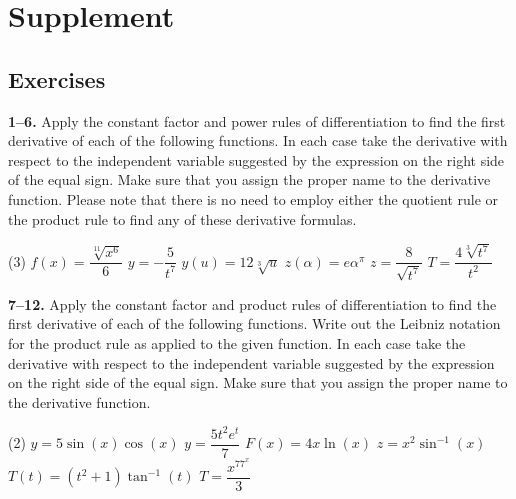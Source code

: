 \documentclass[10pt,oneside,]{book}
\theoremstyle{plain}
\theoremstyle{definition}
\numberwithin{equation}{section}
\newcommand{\fe}[2]{#1\mathopen{}\left(#2\right)\mathclose{}}
\begin{document}
\section[Supplement]{Supplement}\label{derivative-formulas-supplementary-exercises}
\typeout{************************************************}
\typeout{************************************************}
\subsection[Exercises]{Exercises}\label{exercises-42}
\textbf{1--6. }\hypertarget{exercisegroup-84}{\null}Apply the constant factor and power rules of differentiation to find the first derivative of each of the following functions.  In each case take the derivative with respect to the independent variable suggested by the expression on the right side of the equal sign.  Make sure that you assign the proper name to the derivative function.  Please note that there is no need to employ either the quotient rule or the product rule to find any of these derivative formulas.%
\par
\begin{exercisegroup}(3)
\exercise[1.]\hypertarget{exercise-402}{\null}\(\fe{f}{x}=\dfrac{\sqrt[11]{x^6}}{6}\)%
\exercise[2.]\hypertarget{exercise-403}{\null}\(y=-\dfrac{5}{t^7}\)%
\exercise[3.]\hypertarget{exercise-404}{\null}\(\fe{y}{u}=12\sqrt[3]{u}\)%
\exercise[4.]\hypertarget{exercise-405}{\null}\(\fe{z}{\alpha}=e\alpha^{\pi}\)%
\exercise[5.]\hypertarget{exercise-406}{\null}\(z=\dfrac{8}{\sqrt{t^7}}\)%
\exercise[6.]\hypertarget{exercise-407}{\null}\(T=\dfrac{4\sqrt[3]{t^7}}{t^2}\)%
\end{exercisegroup}
\par\smallskip\noindent
\textbf{7--12. }\hypertarget{exercisegroup-85}{\null}Apply the constant factor and product rules of differentiation to find the first derivative of each of the following functions.   Write out the Leibniz notation for the product rule as applied to the given function. In each case take the derivative with respect to the independent variable suggested by the expression on the right side of the equal sign.  Make sure that you assign the proper name to the derivative function.%
\par
\begin{exercisegroup}(2)
\exercise[7.]\hypertarget{exercise-408}{\null}\(y=5\fe{\sin}{x}\fe{\cos}{x}\)%
\exercise[8.]\hypertarget{exercise-409}{\null}\(y=\dfrac{5t^2e^t}{7}\)%
\exercise[9.]\hypertarget{exercise-410}{\null}\(\fe{F}{x}=4x\fe{\ln}{x}\)%
\exercise[10.]\hypertarget{exercise-411}{\null}\(z=x^2\fe{\sin^{-1}}{x}\)%
\exercise[11.]\hypertarget{exercise-412}{\null}\(\fe{T}{t}=(t^2+1)\fe{\tan^{-1}}{t}\)%
\exercise[12.]\hypertarget{exercise-413}{\null}\(T=\dfrac{x^77^x}{3}\)%
\end{exercisegroup}
\end{document}
